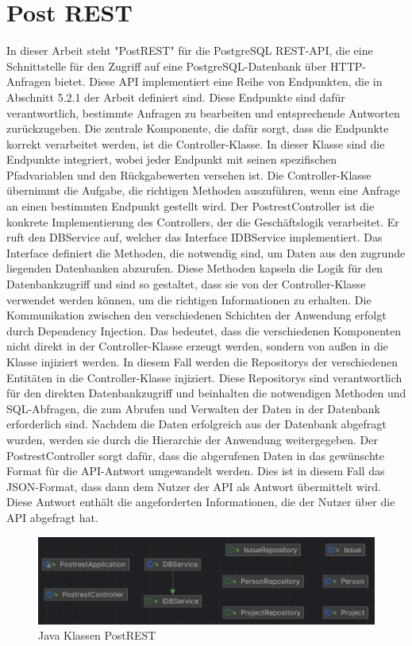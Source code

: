 
\section{Post REST} %
\label{sec:postrest}
In dieser Arbeit steht "PostREST" für die PostgreSQL REST-API, die eine Schnittstelle für den Zugriff auf eine PostgreSQL-Datenbank über HTTP-Anfragen bietet. Diese API implementiert eine Reihe von Endpunkten, die in Abschnitt 5.2.1 der Arbeit definiert sind. Diese Endpunkte sind dafür verantwortlich, bestimmte Anfragen zu bearbeiten und entsprechende Antworten zurückzugeben.
\noindent
Die zentrale Komponente, die dafür sorgt, dass die Endpunkte korrekt verarbeitet werden, ist die Controller-Klasse. In dieser Klasse sind die Endpunkte integriert, wobei jeder Endpunkt mit seinen spezifischen Pfadvariablen und den Rückgabewerten versehen ist. Die Controller-Klasse übernimmt die Aufgabe, die richtigen Methoden auszuführen, wenn eine Anfrage an einen bestimmten Endpunkt gestellt wird.
\noindent
Der PostrestController ist die konkrete Implementierung des Controllers, der die Geschäftslogik verarbeitet. Er ruft den DBService auf, welcher das Interface IDBService implementiert. Das Interface definiert die Methoden, die notwendig sind, um Daten aus den zugrunde liegenden Datenbanken abzurufen. Diese Methoden kapseln die Logik für den Datenbankzugriff und sind so gestaltet, dass sie von der Controller-Klasse verwendet werden können, um die richtigen Informationen zu erhalten.
\noindent
Die Kommunikation zwischen den verschiedenen Schichten der Anwendung erfolgt durch Dependency Injection. Das bedeutet, dass die verschiedenen Komponenten nicht direkt in der Controller-Klasse erzeugt werden, sondern von außen in die Klasse injiziert werden. In diesem Fall werden die Repositorys der verschiedenen Entitäten in die Controller-Klasse injiziert. Diese Repositorys sind verantwortlich für den direkten Datenbankzugriff und beinhalten die notwendigen Methoden und SQL-Abfragen, die zum Abrufen und Verwalten der Daten in der Datenbank erforderlich sind.
\noindent
Nachdem die Daten erfolgreich aus der Datenbank abgefragt wurden, werden sie durch die Hierarchie der Anwendung weitergegeben. Der PostrestController sorgt dafür, dass die abgerufenen Daten in das gewünschte Format für die API-Antwort umgewandelt werden. Dies ist in diesem Fall das JSON-Format, dass dann dem Nutzer der API als Antwort übermittelt wird. Diese Antwort enthält die angeforderten Informationen, die der Nutzer über die API abgefragt hat.
\begin{figure}[H]
	\centering
	\includegraphics[scale=0.5]{Illustrations/postrest.png}
	\caption{Java Klassen PostREST}
\end{figure}

